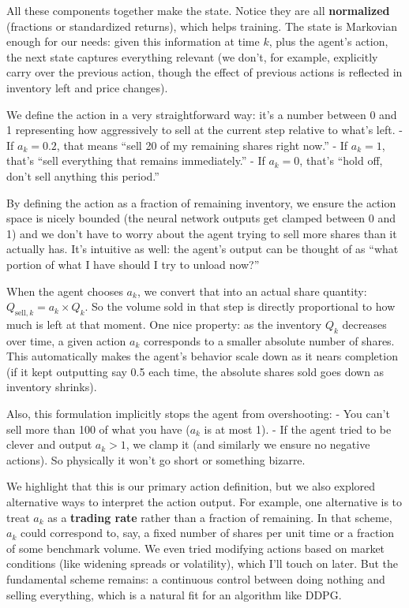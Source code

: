 \documentclass[11pt]{article}
\begin{document}
		All these components together make the state. Notice they are all \textbf{normalized} (fractions or standardized returns), which helps training. The state is Markovian enough for our needs: given this information at time $k$, plus the agent’s action, the next state captures everything relevant (we don’t, for example, explicitly carry over the previous action, though the effect of previous actions is reflected in inventory left and price changes).
	
	
	
		We define the action in a very straightforward way: it’s a number between 0 and 1 representing how aggressively to sell at the current step relative to what’s left.
		- If $a_k = 0.2$, that means “sell 20 of my remaining shares right now.”
		- If $a_k = 1$, that’s “sell everything that remains immediately.”
		- If $a_k = 0$, that’s “hold off, don’t sell anything this period.”
		
		By defining the action as a fraction of remaining inventory, we ensure the action space is nicely bounded (the neural network outputs get clamped between 0 and 1) and we don’t have to worry about the agent trying to sell more shares than it actually has. It’s intuitive as well: the agent’s output can be thought of as “what portion of what I have should I try to unload now?”
		
		When the agent chooses $a_k$, we convert that into an actual share quantity: $Q_{\text{sell},k} = a_k \times Q_k$. So the volume sold in that step is directly proportional to how much is left at that moment. One nice property: as the inventory $Q_k$ decreases over time, a given action $a_k$ corresponds to a smaller absolute number of shares. This automatically makes the agent’s behavior scale down as it nears completion (if it kept outputting say 0.5 each time, the absolute shares sold goes down as inventory shrinks).
		
		Also, this formulation implicitly stops the agent from overshooting:
		- You can’t sell more than 100 of what you have ($a_k$ is at most 1).
		- If the agent tried to be clever and output $a_k > 1$, we clamp it (and similarly we ensure no negative actions). So physically it won’t go short or something bizarre.
		
		We highlight that this is our primary action definition, but we also explored alternative ways to interpret the action output. For example, one alternative is to treat $a_k$ as a \textbf{trading rate} rather than a fraction of remaining. In that scheme, $a_k$ could correspond to, say, a fixed number of shares per unit time or a fraction of some benchmark volume. We even tried modifying actions based on market conditions (like widening spreads or volatility), which I’ll touch on later. But the fundamental scheme remains: a continuous control between doing nothing and selling everything, which is a natural fit for an algorithm like DDPG.
	
\end{document}
